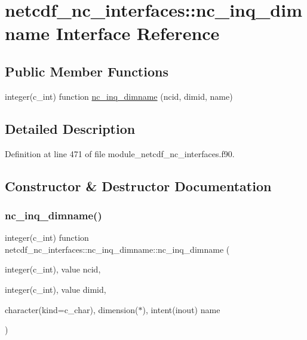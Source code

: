 \hypertarget{interfacenetcdf__nc__interfaces_1_1nc__inq__dimname}{}\section{netcdf\+\_\+nc\+\_\+interfaces\+:\+:nc\+\_\+inq\+\_\+dimname Interface Reference}
\label{interfacenetcdf__nc__interfaces_1_1nc__inq__dimname}
\subsection*{Public Member Functions}
\begin{DoxyCompactItemize}
\item 
integer(c\+\_\+int) function \hyperlink{interfacenetcdf__nc__interfaces_1_1nc__inq__dimname_a9aa047f0b8de7748a2a8b99cf3761ba6}{nc\+\_\+inq\+\_\+dimname} (ncid, dimid, name)
\end{DoxyCompactItemize}


\subsection{Detailed Description}


Definition at line 471 of file module\+\_\+netcdf\+\_\+nc\+\_\+interfaces.\+f90.



\subsection{Constructor \& Destructor Documentation}
\mbox{\label{interfacenetcdf__nc__interfaces_1_1nc__inq__dimname_a9aa047f0b8de7748a2a8b99cf3761ba6}} 
\subsubsection{\texorpdfstring{nc\+\_\+inq\+\_\+dimname()}{nc\_inq\_dimname()}}
{\footnotesize\ttfamily integer(c\+\_\+int) function netcdf\+\_\+nc\+\_\+interfaces\+::nc\+\_\+inq\+\_\+dimname\+::nc\+\_\+inq\+\_\+dimname (\begin{DoxyParamCaption}\item[{integer(c\+\_\+int), value}]{ncid,  }\item[{integer(c\+\_\+int), value}]{dimid,  }\item[{character(kind=c\+\_\+char), dimension($\ast$), intent(inout)}]{name }\end{DoxyParamCaption})}



